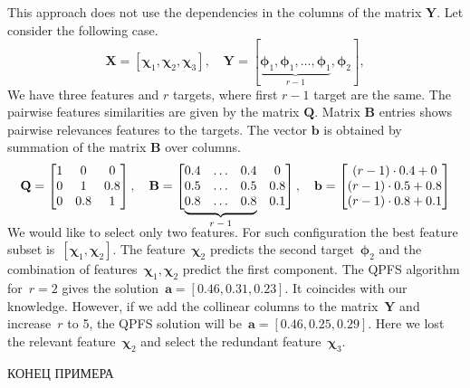 \documentclass[12pt,twoside]{article}
\newcommand{\ba}{\mathbf{a}}
\newcommand{\bb}{\mathbf{b}}
\newcommand{\bY}{\mathbf{Y}}
\newcommand{\bX}{\mathbf{X}}
\newcommand{\bB}{\mathbf{B}}
\newcommand{\bQ}{\mathbf{Q}}
\newcommand{\bchi}{\boldsymbol{\chi}}
\newcommand{\bphi}{\boldsymbol{\phi}}
\newcommand\undermat[2]{%
	\makebox[0pt][l]{$\smash{\underbrace{\phantom{%
					\begin{matrix}#2\end{matrix}}}_{\text{$#1$}}}$}#2}
\begin{document}
This approach does not use the dependencies in the columns of the matrix $\bY$. Let consider the following case.
\[
	\bX = [\bchi_1, \bchi_2, \bchi_3], \quad \bY = [\underbrace{\bphi_1, \bphi_1, \dots, \bphi_1}_{r-1}, \bphi_2],
\]
We have three features and $r$ targets, where first $r-1$ target are the same. 
The pairwise features similarities are given by the matrix $\bQ$. 
Matrix $\bB$ entries shows pairwise relevances features to the targets. 
The vector $\bb$ is obtained by summation of the matrix $\bB$ over columns.
\[
	\bQ = \begin{bmatrix} 1 & 0 & 0\\ 0 & 1 & 0.8 \\ 0 & 0.8 & 1 \end{bmatrix}, \quad 
	\bB = \begin{bmatrix} 0.4 & \dots & 0.4 & 0 \\ 0.5 & \dots & 0.5 & 0.8 \\ \undermat{r-1}{0.8 & \dots & 0.8} & 0.1 \end{bmatrix}, \quad
	\bb = \begin{bmatrix} (r-1) \cdot 0.4 + 0 \\ (r-1) \cdot 0.5 + 0.8 \\ (r-1) \cdot 0.8 + 0.1 \end{bmatrix}
\]
	\vspace{0.5cm}

We would like to select only two features.
For such configuration the best feature subset is~$[\bchi_1, \bchi_2]$. 
The feature~$\bchi_2$ predicts the second target~$\bphi_2$ and the combination of features~$\bchi_1, \bchi_2$ predict the first component. 
The QPFS algorithm for~$r=2$ gives the solution~$\ba = [0.46, 0.31, 0.23]$. It coincides with our knowledge. However, if we add the collinear columns to the matrix~$\bY$ and increase~$r$ to 5, the QPFS solution will be~$\ba = [0.46, 0.25, 0.29]$. Here we lost the relevant feature~$\bchi_2$ and select the redundant feature~$\bchi_3$.

КОНЕЦ ПРИМЕРА
\end{document}
